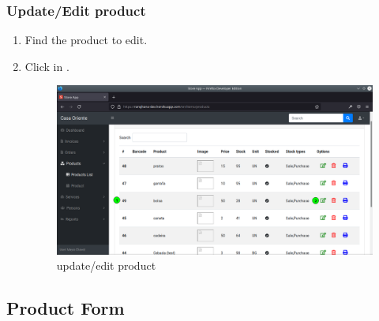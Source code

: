 \documentclass[a4paper,11pt]{refart}
\begin{document}
\subsubsection{Update/Edit product}
\begin{enumerate}
	\item Find the product to edit.
	\item Click in .
	\begin{figure}[H]\centering
		\includegraphics[width=\textwidth]{images/produc_list-update.png}
		\caption{update/edit product}
		\label{fig:produc_list-update.png}
	\end{figure}
\end{enumerate}

\subsection{Product Form}
\end{document}
